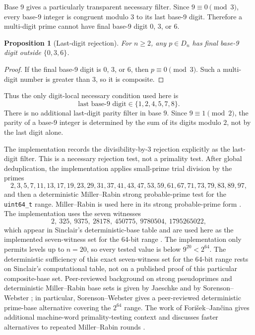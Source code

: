 \documentclass[11pt]{article}
\newtheorem{proposition}{Proposition}
\theoremstyle{definition}
\theoremstyle{remark}
\begin{document}
Base 9 gives a particularly transparent necessary filter.  Since
\(9\equiv 0\pmod 3\), every base-9 integer is congruent modulo \(3\) to its
last base-9 digit.  Therefore a multi-digit prime cannot have final base-9
digit \(0\), \(3\), or \(6\).

\begin{proposition}[Last-digit rejection]
\label{prop:last-digit}
For \(n\geq 2\), any \(p\in D_n\) has final base-9 digit outside
\(\{0,3,6\}\).
\end{proposition}

\begin{proof}
If the final base-9 digit is \(0\), \(3\), or \(6\), then \(p\equiv 0
\pmod 3\).  Such a multi-digit number is greater than \(3\), so it is
composite.
\end{proof}

Thus the only digit-local necessary condition used here is
\[
  \text{last base-9 digit}\in\{1,2,4,5,7,8\}.
\]
There is no additional last-digit parity filter in base \(9\).  Since
\(9\equiv 1\pmod 2\), the parity of a base-9 integer is determined by the
sum of its digits modulo \(2\), not by the last digit alone.

The implementation records the divisibility-by-\(3\) rejection explicitly as
the last-digit filter.  This is a necessary rejection test, not a primality
test.  After global deduplication, the implementation applies small-prime
trial division by the primes
\[
  2,3,5,7,11,13,17,19,23,29,31,37,41,43,47,53,59,61,67,71,73,79,83,89,97,
\]
and then a deterministic Miller--Rabin strong probable-prime test for the
\texttt{uint64\_t} range.  Miller--Rabin is used here in its strong
probable-prime form \cite{Miller1976,Rabin1980}.  The implementation uses
the seven witnesses
\[
  2,\ 325,\ 9375,\ 28178,\ 450775,\ 9780504,\ 1795265022,
\]
which appear in Sinclair's deterministic-base table and are used here as the
implemented seven-witness set for the 64-bit range
\cite{SinclairSPRP}.  The implementation only permits levels up to
\(n=20\), so every tested value is below \(9^{20}<2^{64}\).  The
deterministic sufficiency of this exact seven-witness set for the 64-bit
range rests on Sinclair's computational table, not on a published proof of
this particular composite-base set.  Peer-reviewed background on strong
pseudoprimes and deterministic Miller--Rabin base sets is given by Jaeschke
and by Sorenson--Webster \cite{Jaeschke1993,SorensonWebster2017}; in
particular, Sorenson--Webster gives a peer-reviewed deterministic prime-base
alternative covering the \(2^{64}\) range.  The work of
Fori\v{s}ek--Jan\v{c}ina gives additional machine-word primality-testing
context and discusses faster alternatives to repeated Miller--Rabin rounds
\cite{ForisekJancina2015}.
\end{document}
